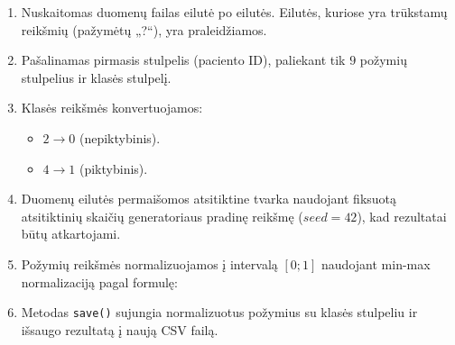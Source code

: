 \begin{enumerate}
    \item Nuskaitomas duomenų failas eilutė po eilutės. Eilutės, kuriose yra trūkstamų reikšmių (pažymėtų „?“), yra praleidžiamos.
    \item Pašalinamas pirmasis stulpelis (paciento ID), paliekant tik $9$ požymių stulpelius ir klasės stulpelį.
    \item Klasės reikšmės konvertuojamos:
        \begin{itemize}
            \item $2 \rightarrow 0$ (nepiktybinis).
            \item $4 \rightarrow 1$ (piktybinis).
        \end{itemize}
    \item Duomenų eilutės permaišomos atsitiktine tvarka naudojant fiksuotą atsitiktinių skaičių generatoriaus pradinę reikšmę ($seed=42$), kad rezultatai būtų atkartojami.
    \item Požymių reikšmės normalizuojamos į intervalą $[0; 1]$ naudojant min-max normalizaciją pagal formulę:
    
    \item Metodas \texttt{save()} sujungia normalizuotus požymius su klasės stulpeliu ir išsaugo rezultatą į naują CSV failą.
\end{enumerate}